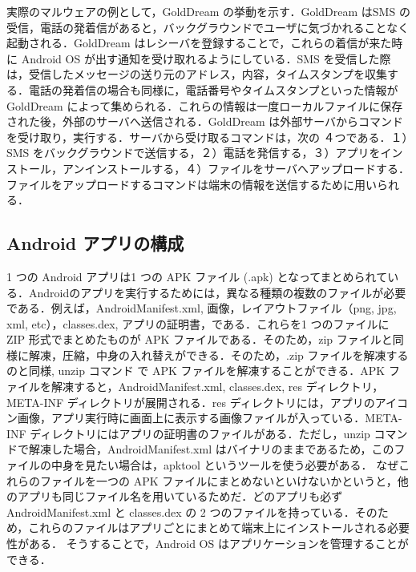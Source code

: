 実際のマルウェアの例として，GoldDream の挙動を示す．GoldDream はSMS の受信，電話の発着信があると，バックグラウンドでユーザに気づかれることなく起動される．GoldDream はレシーバを登録することで，これらの着信が来た時に Android OS が出す通知を受け取れるようにしている．SMS を受信した際は，受信したメッセージの送り元のアドレス，内容，タイムスタンプを収集する．電話の発着信の場合も同様に，電話番号やタイムスタンプといった情報が GoldDream によって集められる．これらの情報は一度ローカルファイルに保存された後，外部のサーバへ送信される．GoldDream は外部サーバからコマンドを受け取り，実行する．サーバから受け取るコマンドは，次の ４つである．１）SMS をバックグラウンドで送信する，２）電話を発信する，３）アプリをインストール，アンインストールする，４）ファイルをサーバへアップロードする．ファイルをアップロードするコマンドは端末の情報を送信するために用いられる．

\subsection{Android アプリの構成}
\label{sec:andrapp}
1 つの Android アプリは1 つの APK ファイル (.apk) となってまとめられている．Androidのアプリを実行するためには，異なる種類の複数のファイルが必要である．例えば，AndroidManifest.xml, 画像，レイアウトファイル（png, jpg, xml, etc），classes.dex, アプリの証明書，である．これらを1 つのファイルに ZIP 形式でまとめたものが APK ファイルである．そのため，zip ファイルと同様に解凍，圧縮，中身の入れ替えができる．そのため，.zip ファイルを解凍するのと同様, unzip コマンド で APK ファイルを解凍することができる．APK ファイルを解凍すると，AndroidManifest.xml, classes.dex, res ディレクトリ，META-INF ディレクトリが展開される．res ディレクトリには，アプリのアイコン画像，アプリ実行時に画面上に表示する画像ファイルが入っている．META-INF ディレクトリにはアプリの証明書のファイルがある．ただし，unzip コマンドで解凍した場合，AndroidManifest.xml はバイナリのままであるため，このファイルの中身を見たい場合は，apktool \cite{apktool} というツールを使う必要がある．
なぜこれらのファイルを一つの APK ファイルにまとめないといけないかというと，他のアプリも同じファイル名を用いているためだ．どのアプリも必ず AndroidManifest.xml と classes.dex の 2 つのファイルを持っている．そのため，これらのファイルはアプリごとにまとめて端末上にインストールされる必要性がある． そうすることで，Android OS はアプリケーションを管理することができる．

